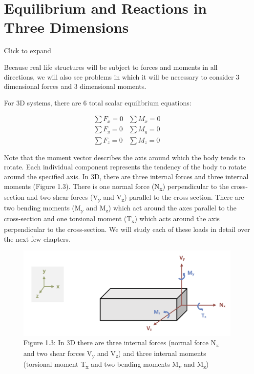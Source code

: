 \documentclass[
  letterpaper,
  DIV=11,
  numbers=noendperiod]{scrreprt}
\begin{document}
\section{Equilibrium and Reactions in Three Dimensions}\label{sec-1.3}

Click to expand

Because real life structures will be subject to forces and moments in
all directions, we will also see problems in which it will be necessary
to consider 3 dimensional forces and 3 dimensional moments.

For 3D systems, there are 6 total scalar equilibrium equations:

\[
\begin{array}{ll}
\sum F_x=0 & \sum M_x=0 \\
\sum F_y=0 & \sum M_y=0 \\
\sum F_z=0 & \sum M_z=0
\end{array}
\]

Note that the moment vector describes the axis around which the body
tends to rotate. Each individual component represents the tendency of
the body to rotate around the specified axis. In 3D, there are three
internal forces and three internal moments (Figure 1.3). There is one
normal force (N\textsubscript{x}) perpendicular to the cross-section and
two shear forces (V\textsubscript{y} and V\textsubscript{z}) parallel to
the cross-section. There are two bending moments (M\textsubscript{y} and
M\textsubscript{z}) which act around the axes parallel to the
cross-section and one torsional moment (T\textsubscript{x}) which acts
around the axis perpendicular to the cross-section. We will study each
of these loads in detail over the next few chapters.

\begin{figure}[H]

{\centering \includegraphics[width=5.3125in,height=\textheight]{images/CH1 PNGs/figure 1.3.png}

}

\caption{Figure 1.3: In 3D there are three internal forces (normal force
N\textsubscript{x} and two shear forces V\textsubscript{y} and
V\textsubscript{z}) and three internal moments (torsional moment
T\textsubscript{x} and two bending moments M\textsubscript{y} and
M\textsubscript{z})}

\end{figure}%
\end{document}
